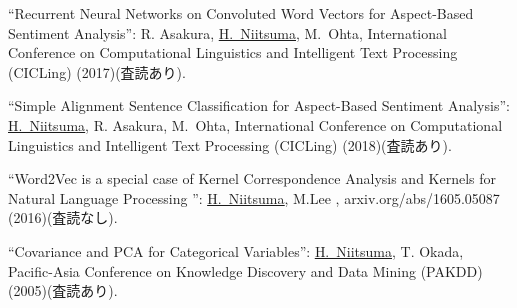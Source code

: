 \documentclass[11pt,a4j,dvipdfmx]{jarticle} 					%
\newcommand{\研究課題名}{人工知能のためのLispシステム}
\newcommand{\研究機関名}{大阪公立大学工業高等専門学校}
\newcommand{\研究代表者氏名}{新妻弘崇}
\newcommand{\me}{\underline{\underline{H.~Niitsuma}}}
\newcommand{\mejp}{\underline{\underline{新妻弘崇}}}
\newcommand{\ohta}{M.~Ohta}
\newcommand{\ohtajp}{太田学}
\newcommand{\研究期間の最終元号年度}{11}  %
\begin{document}



\KLbibitem 
\label{pub:CICLing2017asakura}
``Recurrent Neural Networks on Convoluted Word Vectors for Aspect-Based Sentiment Analysis'':     R. Asakura, \me, \ohta,  International Conference on Computational Linguistics and Intelligent Text Processing (CICLing)  (2017)(査読あり).

\KLbibitem 
\label{pub:CICLing2018asakura}
``Simple Alignment Sentence Classification for Aspect-Based Sentiment Analysis'':     \me,  R. Asakura, \ohta,  International Conference on Computational Linguistics and Intelligent Text Processing (CICLing)  (2018)(査読あり).

\KLbibitem
\label{pub:wordCA2016}
``Word2Vec is a special case of Kernel Correspondence Analysis and Kernels for Natural Language Processing '':     \me,  M.Lee ,  arxiv.org/abs/1605.05087   (2016)(査読なし).

\KLbibitem
\label{pub:pca2005niitsuma}
``Covariance and PCA for Categorical Variables'': \me , T. Okada, Pacific-Asia Conference on Knowledge Discovery and Data Mining (PAKDD) (2005)(査読あり).



        




        
\end{document}
